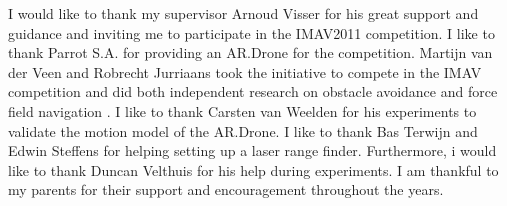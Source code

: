 I would like to thank my supervisor Arnoud Visser for his great support and guidance and inviting me to participate in the IMAV2011 competition.
I like to thank Parrot S.A. for providing an AR.Drone for the competition.
Martijn van der Veen and Robrecht Jurriaans took the initiative to compete in the IMAV competition and did both independent research on obstacle avoidance \cite{Jurriaans2011} and force field navigation \cite{VanDerVeen2011}.
I like to thank Carsten van Weelden for his experiments to validate the motion model of the AR.Drone. 
I like to thank Bas Terwijn and Edwin Steffens for helping setting up a laser range finder.
Furthermore, i would like to thank Duncan Velthuis for his help during experiments.
I am thankful to my parents for their support and encouragement throughout the years.